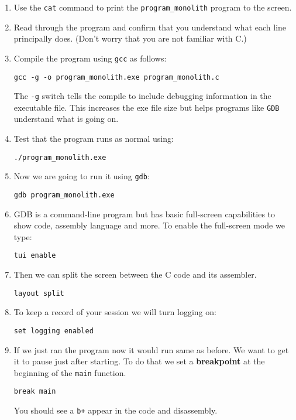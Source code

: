 \begin{enumerate}

\item
  Use the \texttt{cat} command to print the \texttt{program\_monolith} program to the screen.

\item
  Read through the program and confirm that you understand what each line principally does.
  (Don't worry that you are not familiar with C.)

\item
  Compile the program using \texttt{gcc} as follows:
\begin{verbatim}
gcc -g -o program_monolith.exe program_monolith.c
\end{verbatim}
  The \texttt{-g} switch tells the compile to include debugging information in the executable file.
  This increases the exe file size but helps programs like \texttt{GDB} understand what is going on.

\item
  Test that the program runs as normal using:
\begin{verbatim}
./program_monolith.exe
\end{verbatim}

\item
  Now we are going to run it using \texttt{gdb}:
\begin{verbatim}
gdb program_monolith.exe
\end{verbatim}

\item
  GDB is a command-line program but has basic full-screen capabilities to show code, assembly language and more.
  To enable the full-screen mode we type:
\begin{verbatim}
tui enable
\end{verbatim}

\item
  Then we can split the screen between the C code and its assembler.
\begin{verbatim}
layout split
\end{verbatim}

\item
  To keep a record of your session we will turn logging on:
\begin{verbatim}
set logging enabled
\end{verbatim}

\item
  If we just ran the program now it would run same as before.
  We want to get it to pause just after starting.
  To do that we set a \textbf{breakpoint} at the beginning of the \texttt{main} function.
\begin{verbatim}
break main
\end{verbatim}
  You should see a \texttt{b+} appear in the code and disassembly.


\end{enumerate}
